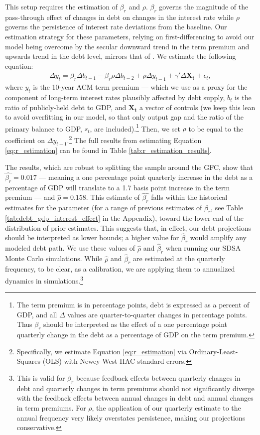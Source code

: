 \documentclass[12pt]{article}
\begin{document}
This setup requires the estimation of $\beta_r$ and $\rho$. $\beta_r$ governs the magnitude of the pass-through effect of changes in debt on changes in the interest rate while $\rho$ governs the persistence of interest rate deviations from the baseline. Our estimation strategy for these parameters, relying on first-differencing to avoid our model being overcome by the secular downward trend in the term premium and upwards trend in the debt level, mirrors that of \textcite{gust2024government}. We estimate the following equation:
\begin{gather}
    \Delta y_t = \beta_r \Delta b_{t-1} - \beta_r \rho \Delta b_{t-2} + \rho \Delta y_{t-1} + \gamma ' \Delta \mathbf{X_t} + \epsilon_t,
    \label{eq:r_estimation}
\end{gather}
where $y_t$ is the 10-year ACM term premium \parencite{adrian_2012} --- which we use as a proxy for the component of long-term interest rates plausibly affected by debt supply, $b_t$ is the ratio of publicly-held debt to GDP, and $\mathbf{X_t}$ a vector of controls (we keep this lean to avoid overfitting in our model, so that only output gap and the ratio of the primary balance to GDP, $s_t$, are included).\footnote{The term premium is in percentage points, debt is expressed as a percent of GDP, and all $\Delta$ values are quarter-to-quarter changes in percentage points. Thus $\beta_r$ should be interpreted as the effect of a one percentage point quarterly change in the debt as a percentage of GDP on the term premium.} Then, we set $\rho$ to be equal to the coefficient on $\Delta y_{t-1}$.\footnote{Specifically, we estimate Equation \ref{eq:r_estimation} via Ordinary-Least-Squares (OLS) with Newey-West HAC standard errors.} The full results from estimating Equation \ref{eq:r_estimation} can be found in Table \ref{tab:r_estimation_results}. 

The results, which are robust to splitting the sample around the GFC, show that $\hat{\beta_r} = 0.017$ --- meaning a one percentage point quarterly increase in the debt as a percentage of GDP will translate to a 1.7 basis point increase in the term premium --- and $\hat{\rho} = 0.158$. This estimate of $\hat{\beta_r}$ falls within the historical estimates for the parameter (for a range of previous estimates of $\beta_r$, see Table \ref{tab:debt_gdp_interest_effect} in the Appendix), toward the lower end of the distribution of prior estimates. This suggests that, in effect, our debt projections should be interpreted as lower bounds; a higher value for $\hat{\beta}_r$ would amplify any modeled debt path. We use these values of $\hat{\rho}$ and $\hat{\beta}_r$ when running our SDSA Monte Carlo simulations. While $\hat{\rho}$ and $\hat{\beta}_r$ are estimated at the quarterly frequency, to be clear, as a calibration, we are applying them to annualized dynamics in simulations.\footnote{This is valid for $\beta_r$ because feedback effects between quarterly changes in debt and quarterly changes in term premiums should not significantly diverge with the feedback effects between annual changes in debt and annual changes in term premiums. For $\rho$, the application of our quarterly estimate to the annual frequency very likely overstates persistence, making our projections conservative.}
\end{document}
